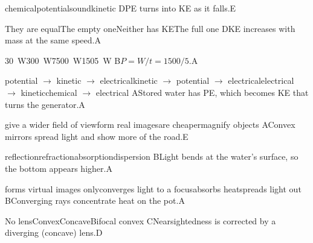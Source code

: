 \begin{gradebody}
{chemical}{potential}{sound}{kinetic}
{D}{PE turns into KE as it falls.}{E}

{They are equal}{The empty one}{Neither has KE}{The full one}
{D}{KE increases with mass at the same speed.}{A}

{\SI{30}{W}}{\SI{300}{W}}{\SI{7500}{W}}{\SI{1505}{W}}
{B}{$P = W/t = 1500/5$.}{A}

{potential $\rightarrow$ kinetic $\rightarrow$ electrical}{kinetic $\rightarrow$ potential $\rightarrow$ electrical}{electrical $\rightarrow$ kinetic}{chemical $\rightarrow$ electrical}
{A}{Stored water has PE, which becomes KE that turns the generator.}{A}

{give a wider field of view}{form real images}{are cheaper}{magnify objects}
{A}{Convex mirrors spread light and show more of the road.}{E}

{reflection}{refraction}{absorption}{dispersion}
{B}{Light bends at the water's surface, so the bottom appears higher.}{A}

{forms virtual images only}{converges light to a focus}{absorbs heat}{spreads light out}
{B}{Converging rays concentrate heat on the pot.}{A}

{No lens}{Convex}{Concave}{Bifocal convex}
{C}{Nearsightedness is corrected by a diverging (concave) lens.}{D}

\end{gradebody}
\probstats
